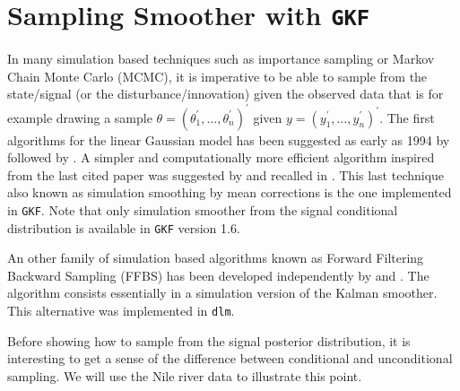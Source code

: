\documentclass{article}
\newcommand{\GKF}{\texttt{GKF}\xspace}
\begin{document}
\section{Sampling Smoother with \GKF}
\label{sec:SamplingSmoother}

In many simulation based techniques such as importance sampling or Markov Chain Monte Carlo
(MCMC), it is imperative to be able to sample from the state/signal (or the
disturbance/innovation) given the observed data that is for example drawing a sample
$\theta=(\theta_1^\prime,\dots,\theta_n^\prime)^{\prime} $ given
$y=(y_1^\prime,\dots,y_n^\prime)^\prime $. The first algorithms for the linear Gaussian model
has been suggested as early as 1994 by \citet{fruhwirth1994data} followed by
\citet{de1995simulation}. A simpler and computationally more efficient algorithm inspired
from the last cited paper was suggested by \citet{durbin2002simple} and recalled in
\citet[chap. 4.9]{durbin2012time}. This last technique also known as simulation smoothing by
mean corrections is the one implemented in \GKF. Note that only simulation smoother from the
signal conditional distribution is available in \GKF version 1.6.

An other family of simulation based algorithms known as Forward Filtering Backward Sampling
(FFBS) has been developed independently by \citet{carter1994gibbs} and
\citet{shephard1994partial}. The algorithm consists essentially in a simulation version of
the Kalman smoother. This alternative was implemented in \texttt{dlm}.

Before showing how to sample from the signal posterior distribution, it is interesting to get
a sense of the difference between conditional and unconditional sampling. We will use the
Nile river data to illustrate this point.
\end{document}
